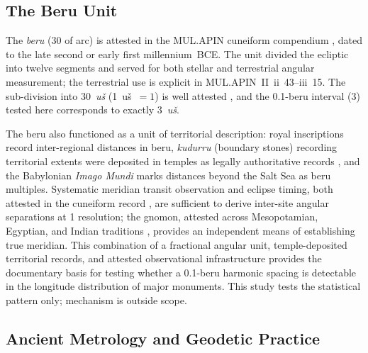 \documentclass[HARVARD,twocolumn]{USG}
\begin{document}
\subsection{The Beru Unit}
\label{sec:beru}

The \textit{beru} (30\textdegree{} of arc) is attested in the MUL.APIN
cuneiform compendium \citep{hunger2019mul,watson2011writing}, dated to the late
second or early first millennium~BCE. The unit divided the ecliptic into twelve
segments and served for both stellar and terrestrial angular measurement;
the terrestrial use is explicit in MUL.APIN~II~ii~43--iii~15. The sub-division
into 30~\textit{u\v{s}} (1~u\v{s}~$= 1$\textdegree{}) is well attested
\citep{hunger2019mul,robson2008mathematics}, and the 0.1-beru interval
(3\textdegree{}) tested here corresponds to exactly 3~\textit{u\v{s}}.

The beru also functioned as a unit of territorial description: royal
inscriptions record inter-regional distances in beru, \textit{kudurru}
(boundary stones) recording territorial extents were deposited in temples
as legally authoritative records \citep{robson2008mathematics,powell1987metrological},
and the Babylonian \textit{Imago Mundi} marks distances beyond the Salt Sea
as beru multiples.
Systematic meridian transit observation and eclipse timing, both attested
in the cuneiform record \citep{hunger2019mul,neugebauer1975history}, are
sufficient to derive inter-site angular separations at 1\textdegree{} resolution;
the gnomon, attested across Mesopotamian, Egyptian, and Indian traditions
\citep{neugebauer1975history,shamasastry1915arthashastra}, provides an independent
means of establishing true meridian.
This combination of a fractional angular unit, temple-deposited territorial
records, and attested observational infrastructure provides the documentary
basis for testing whether a 0.1-beru harmonic spacing is detectable in the
longitude distribution of major monuments.
This study tests the statistical pattern only; mechanism is outside scope.

\subsection{Ancient Metrology and Geodetic Practice}
\end{document}
